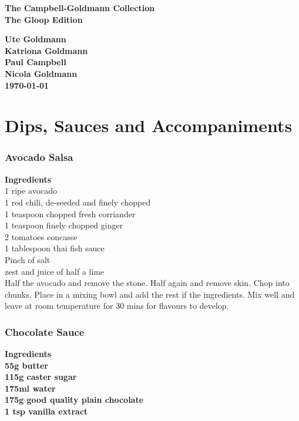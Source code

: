 \documentclass[18pt, oneside]{book}
\begin{document}
\begin{center}

\vspace*{3cm}
\Huge\bf The Campbell-Goldmann Collection \\
\vspace*{1cm}
\huge \bf The Gloop Edition


\par\noindent \vspace*{2cm}


\Large\bf Ute Goldmann  \\
Katriona Goldmann \\
Paul Campbell \\
Nicola Goldmann \\
\vspace*{0.5cm}   \today                               
\end{center}
\vspace*{5mm}
\thispagestyle{empty}



\tableofcontents

\part{Dips, Sauces and Accompaniments}
\setcounter{chapter}{1}

\section{Avocado Salsa}
\textbf{Ingredients} \\
1 ripe avocado \\
1 red chili, de-seeded and finely chopped \\
1 teaspoon chopped fresh corriander \\
1 teaspoon finely chopped ginger \\
2 tomatoes concasse \\
1 tablespoon thai fish sauce \\
Pinch of salt \\
zest and juice of half a lime \\

Half the avocado and remove the stone. Half again and remove skin. Chop into chunks. Place in a mixing bowl and add the rest if the ingredients.  Mix well and leave at room temperature for 30 mins for flavours to develop. 

\section{Chocolate Sauce}
\bf{Ingredients} \normalfont \\
55g butter \\
115g caster sugar \\ 
175ml water \\
175g good quality plain chocolate \\
1 tsp vanilla extract \\ 
\end{document}
